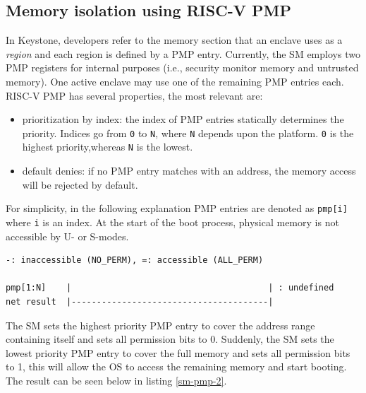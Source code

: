 \subsection{Memory isolation using RISC-V PMP}
In Keystone, developers refer to the memory section that an enclave uses as a \textit{region} and each region is defined by a PMP entry. Currently, the SM employs two PMP registers for internal purposes (i.e., security monitor memory and untrusted memory). One active enclave may use one of the remaining PMP entries each. RISC-V PMP has several properties, the most relevant are: 
\begin{itemize}
    \item prioritization by index: the index of PMP entries statically determines the priority. Indices go from \texttt{0} to \texttt{N}, where \texttt{N} depends upon the platform. \texttt{0} is the highest priority,whereas \texttt{N} is the lowest. 
    \item default denies: if no PMP entry matches with an address, the memory access will be rejected by default.
\end{itemize}
For simplicity, in the following explanation PMP entries are denoted as \texttt{pmp[i]} where \texttt{i} is an index. At the start of the boot process, physical memory is not accessible by U- or S-modes. \\

\begin{lstlisting}[frame=single,showspaces=true,caption={Memory state when booting start \cite{keystone-doc}},captionpos=b,label={sm-pmp-1}]
-: inaccessible (NO_PERM), =: accessible (ALL_PERM)

pmp[1:N]    |                                       | : undefined
net result  |---------------------------------------|   
\end{lstlisting}
\noindent
The SM sets the highest priority PMP entry to cover the address range containing itself and sets all permission bits to 0. Suddenly, the SM sets the lowest priority PMP entry to cover the full memory and sets all permission bits to 1, this will allow the OS to access the remaining memory and start booting. The result can be seen below in listing \ref{sm-pmp-2}. \\


